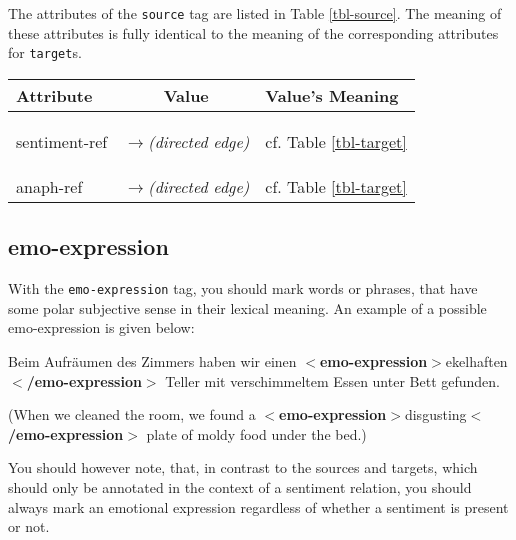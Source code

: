 \documentclass[11pt,a4paper]{article}
\newcommand{\xmltag}[1]{{\textbf{\small$<$#1$>$}}}
\newcommand{\emoexpression}[1]{\xmltag{emo-expression}#1\xmltag{/emo-expression}}
\newlength\clmnwidth
\newenvironment{myexe}{
  \begin{exe}
    \ex\begin{center}
    \itshape
}{
    \end{center}
  \end{exe}
}
\begin{document}
The attributes of the \texttt{source} tag are listed in Table
\ref{tbl-source}.  The meaning of these attributes is fully identical
to the meaning of the corresponding attributes for \texttt{target}s.
\begin{center}
  \begin{tabular}{|l|c|p{\clmnwidth}|}\hline
    Attribute & Value & Value's Meaning\\\hline\label{tbl-source}

    sentiment-ref & \textit{$\longrightarrow$\newline(directed edge)}
    & cf. Table \ref{tbl-target}\\\hline

    anaph-ref & \textit{$\longrightarrow$\newline(directed edge)} &
    cf. Table \ref{tbl-target}\\\hline
  \end{tabular}
\end{center}

\subsection{emo-expression}
With the \texttt{emo-expression} tag, you should mark words or
phrases, that have some polar subjective sense in their lexical
meaning.  An example of a possible emo-expression is given below:
\begin{myexe}
  Beim Aufr\"aumen des Zimmers haben wir einen \emoexpression{ekelhaften }
  Teller mit verschimmeltem Essen unter Bett gefunden.

  (When we cleaned the room, we found a \emoexpression{disgusting}
  plate of moldy food under the bed.)
\end{myexe}

You should however note, that, in contrast to the sources and targets, which
should only be annotated in the context of a sentiment relation, you should
always mark an emotional expression regardless of whether a sentiment is
present or not.
\end{document}
